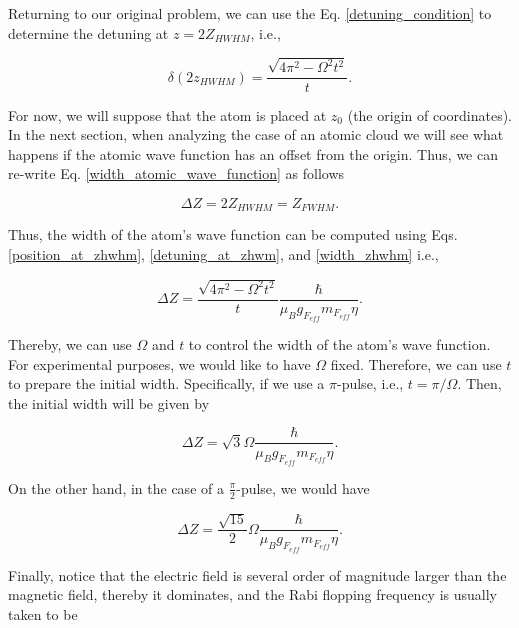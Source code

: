\documentclass{article}
\begin{document}
Returning to our original problem, we can use the Eq. \ref{detuning_condition} to determine the detuning at $z=2Z_{HWHM}$, i.e.,

\begin{equation}\label{detuning_at_zhwm}
\delta (2z_{HWHM}) = \frac{\sqrt{4 \pi^{2} - \Omega^{2} t^{2}}}{t}.
\end{equation}

For now, we will suppose that the atom is placed at $z_{0}$ (the origin of coordinates). In the next section, when analyzing the case of an atomic cloud we will see what happens if the atomic wave function has an offset from the origin. Thus, we can re-write Eq. \ref{width_atomic_wave_function} as follows

\begin{equation}\label{width_zhwhm}
  \Delta Z = 2Z_{HWHM} = Z_{FWHM}.
\end{equation}

Thus, the width of the atom's wave function can be computed using Eqs.  \ref{position_at_zhwhm}, \ref{detuning_at_zhwm}, and \ref{width_zhwhm} i.e.,

\begin{equation}
\Delta Z = \frac{\sqrt{4 \pi^{2} - \Omega^{2} t^{2}}}{t} \frac{\hbar}{\mu_{B} g_{F_{eff}} m_{F_{eff}} \eta}.
\end{equation}

Thereby, we can use $\Omega$ and $t$ to control the width of the atom's wave function. For experimental purposes, we would like to have $\Omega$ fixed. Therefore, we can use $t$ to prepare the initial width. Specifically, if we use a $\pi$-pulse, i.e., $t=\pi/\Omega$. Then, the initial width will be given by

\begin{equation}\label{initial_width}
\Delta Z = \sqrt{3} \Omega \frac{\hbar}{\mu_{B} g_{F_{eff}} m_{F_{eff}} \eta}.
\end{equation}

On the other hand, in the case of a $\frac{\pi}{2}$-pulse, we would have

\begin{equation}\label{initial_width_pi/2}
\Delta Z = \frac{\sqrt{15}}{2} \Omega \frac{\hbar}{\mu_{B} g_{F_{eff}} m_{F_{eff}} \eta}.
\end{equation}

Finally, notice that the electric field is several order of magnitude larger than the magnetic field, thereby it dominates, and the Rabi flopping frequency is usually taken to be
\end{document}
